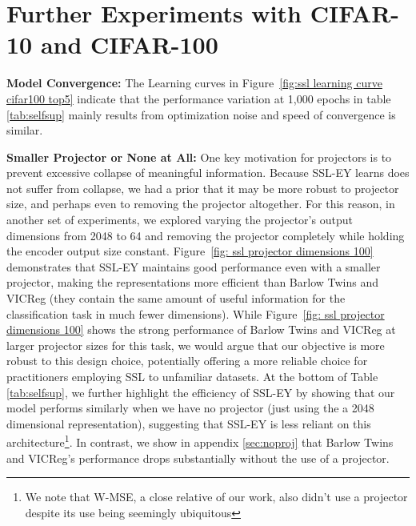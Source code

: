 \section{Further Experiments with CIFAR-10 and CIFAR-100}\label{sec:experiments}

\textbf{Model Convergence:} The Learning curves in Figure~\ref{fig:ssl learning curve cifar100 top5} indicate that the performance variation at 1,000 epochs in table \ref{tab:selfsup} mainly results from optimization noise and speed of convergence is similar.

\textbf{Smaller Projector or None at All:}
One key motivation for projectors is to prevent excessive collapse of meaningful information. Because SSL-EY learns does not suffer from collapse, we had a prior that it may be more robust to projector size, and perhaps even to removing the projector altogether.
For this reason, in another set of experiments, we explored varying the projector's output dimensions from 2048 to 64 and removing the projector completely while holding the encoder output size constant. Figure~\ref{fig: ssl projector dimensions 100} demonstrates that SSL-EY maintains good performance even with a smaller projector, making the representations more efficient than Barlow Twins and VICReg (they contain the same amount of useful information for the classification task in much fewer dimensions). While Figure~\ref{fig: ssl projector dimensions 100} shows the strong performance of Barlow Twins and VICReg at larger projector sizes for this task, we would argue that our objective is more robust to this design choice, potentially offering a more reliable choice for practitioners employing SSL to unfamiliar datasets. At the bottom of Table \ref{tab:selfsup}, we further highlight the efficiency of SSL-EY by showing that our model performs similarly when we have no projector (just using the a 2048 dimensional representation), suggesting that SSL-EY is less reliant on this architecture\footnote{We note that W-MSE, a close relative of our work, also didn't use a projector despite its use being seemingly ubiquitous}. In contrast, we show in appendix \ref{sec:noproj} that Barlow Twins and VICReg's performance drops substantially without the use of a projector.

